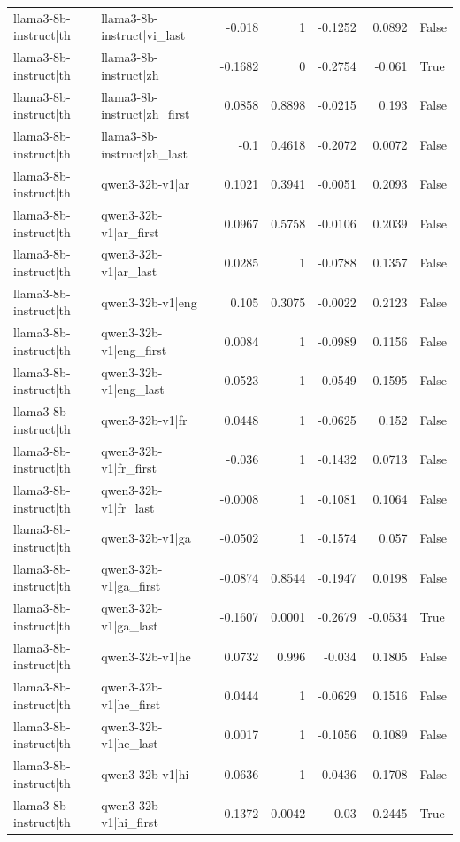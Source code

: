 \begin{table}
\begin{tabular}{l l r r r r l}
llama3-8b-instruct|th & llama3-8b-instruct|vi_last & -0.018 & 1 & -0.1252 & 0.0892 & False \\
llama3-8b-instruct|th & llama3-8b-instruct|zh & -0.1682 & 0 & -0.2754 & -0.061 & True \\
llama3-8b-instruct|th & llama3-8b-instruct|zh_first & 0.0858 & 0.8898 & -0.0215 & 0.193 & False \\
llama3-8b-instruct|th & llama3-8b-instruct|zh_last & -0.1 & 0.4618 & -0.2072 & 0.0072 & False \\
llama3-8b-instruct|th & qwen3-32b-v1|ar & 0.1021 & 0.3941 & -0.0051 & 0.2093 & False \\
llama3-8b-instruct|th & qwen3-32b-v1|ar_first & 0.0967 & 0.5758 & -0.0106 & 0.2039 & False \\
llama3-8b-instruct|th & qwen3-32b-v1|ar_last & 0.0285 & 1 & -0.0788 & 0.1357 & False \\
llama3-8b-instruct|th & qwen3-32b-v1|eng & 0.105 & 0.3075 & -0.0022 & 0.2123 & False \\
llama3-8b-instruct|th & qwen3-32b-v1|eng_first & 0.0084 & 1 & -0.0989 & 0.1156 & False \\
llama3-8b-instruct|th & qwen3-32b-v1|eng_last & 0.0523 & 1 & -0.0549 & 0.1595 & False \\
llama3-8b-instruct|th & qwen3-32b-v1|fr & 0.0448 & 1 & -0.0625 & 0.152 & False \\
llama3-8b-instruct|th & qwen3-32b-v1|fr_first & -0.036 & 1 & -0.1432 & 0.0713 & False \\
llama3-8b-instruct|th & qwen3-32b-v1|fr_last & -0.0008 & 1 & -0.1081 & 0.1064 & False \\
llama3-8b-instruct|th & qwen3-32b-v1|ga & -0.0502 & 1 & -0.1574 & 0.057 & False \\
llama3-8b-instruct|th & qwen3-32b-v1|ga_first & -0.0874 & 0.8544 & -0.1947 & 0.0198 & False \\
llama3-8b-instruct|th & qwen3-32b-v1|ga_last & -0.1607 & 0.0001 & -0.2679 & -0.0534 & True \\
llama3-8b-instruct|th & qwen3-32b-v1|he & 0.0732 & 0.996 & -0.034 & 0.1805 & False \\
llama3-8b-instruct|th & qwen3-32b-v1|he_first & 0.0444 & 1 & -0.0629 & 0.1516 & False \\
llama3-8b-instruct|th & qwen3-32b-v1|he_last & 0.0017 & 1 & -0.1056 & 0.1089 & False \\
llama3-8b-instruct|th & qwen3-32b-v1|hi & 0.0636 & 1 & -0.0436 & 0.1708 & False \\
llama3-8b-instruct|th & qwen3-32b-v1|hi_first & 0.1372 & 0.0042 & 0.03 & 0.2445 & True \\

\end{tabular}
\end{table}
